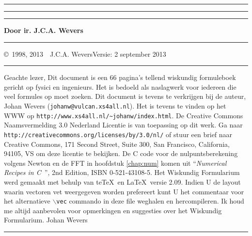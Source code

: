 \pagestyle{fancyplain}
\cfoot{\fancyplain{\thepage}{}}

\thispagestyle{empty}
\hrule
\rule{.4pt}{22.35cm}\hspace*{161.62mm}\rule{.4pt}{22.35cm}
\vspace*{-17cm}
\begin{center}
\Huge
{}
\end{center}
\vspace{2cm}
\centerline{\Large\bf Door ir. J.C.A. Wevers}
\vfill
\hrule
\newpage
\thispagestyle{empty}
\copyright~1998, 2013~~J.C.A. Wevers\hfill Versie: 2 september 2013
\npar
\hrule
\par
\bigskip
Geachte lezer,
\npar
Dit document is een 66 pagina's tellend wiskundig formuleboek gericht
op fysici en ingenieurs. Het is bedoeld als naslagwerk voor iedereen die
veel formules op moet zoeken.
\npar
Dit document is tevens te verkrijgen bij de auteur, Johan Wevers ({\tt johanw@vulcan.xs4all.nl}).
\npar
Het is tevens te vinden op het WWW op {\tt http://www.xs4all.nl/\~{}johanw/index.html}.
\npar
De Creative Commons Naamsvermelding 3.0 Nederland Licentie is van toepassing op dit werk.
Ga naar {\tt http://creativecommons.org/licenses/by/3.0/nl/} of stuur een brief naar Creative Commons, 171 Second Street, Suite 300, San Francisco, California, 94105, VS om deze licentie te bekijken.
\npar
De C code voor de nulpuntsberekening volgens Newton en de FFT in hoofdstuk
\ref{chap:num} komen uit ``{\it Numerical Recipes in C}~'', 2nd Edition,
ISBN 0-521-43108-5.
\npar
Het Wiskundig Formularium werd gemaakt met behulp van te\TeX\ en \LaTeX\ versie 2.09.
\npar
Indien U de layout waarin vectoren vet weergegeven worden prefereert kunt U
het commentaar voor het alternatieve {\tt $\backslash$vec} commando in deze
file weghalen en hercompileren.
\npar
Ik houd me altijd aanbevolen voor opmerkingen en suggesties over het
Wiskundig Formularium.
\npar
Johan Wevers
\vfill
\hrule

\newpage

\tableofcontents
\cleardoublepage


\renewcommand{\chaptermark}[1]{\markboth{#1}{#1}}


